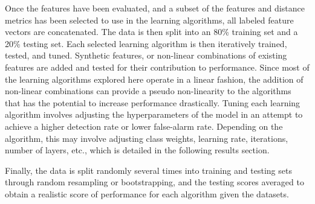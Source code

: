 Once the features have been evaluated, and a subset of the features and distance metrics has been selected to use in the learning algorithms, all labeled feature vectors are concatenated.
The data is then split into an 80\% training set and a 20\% testing set.
Each selected learning algorithm is then iteratively trained, tested, and tuned.
Synthetic features, or non-linear combinations of existing features are added and tested for their contribution to performance.
Since most of the learning algorithms explored here operate in a linear fashion, the addition of non-linear combinations can provide a pseudo non-linearity to the algorithms that has the potential to increase performance drastically.
Tuning each learning algorithm involves adjusting the hyperparameters of the model in an attempt to achieve a higher detection rate or lower false-alarm rate.
Depending on the algorithm, this may involve adjusting class weights, learning rate, iterations, number of layers, etc., which is detailed in the following results section.

Finally, the data is split randomly several times into training and testing sets through random resampling or bootstrapping, and the testing scores averaged to obtain a realistic score of performance for each algorithm given the datasets.

